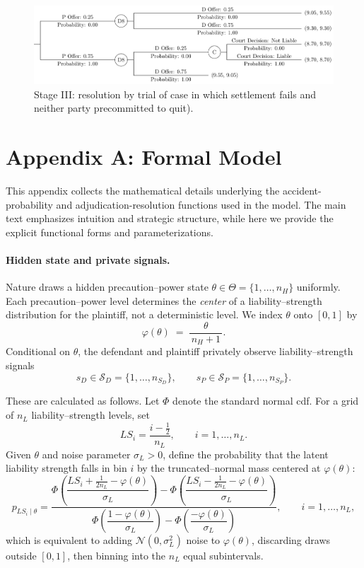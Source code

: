 \documentclass{article}
\begin{document}
  \begin{figure}[t]
    \centering
    \includegraphics[width=\textwidth]{../Figures/smalltree_end_adjudication.pdf}
    \caption{Stage III: resolution by trial of case in which settlement fails and neither party precommitted to quit).}
    \label{fig:smalltree_end_adjudication.pdf}
  \end{figure}

\section*{Appendix A: Formal Model}

This appendix collects the mathematical details underlying the accident-probability and adjudication-resolution functions used in the model. The main text emphasizes intuition and strategic structure, while here we provide the explicit functional forms and parameterizations. 
\paragraph{Hidden state and private signals.}
Nature draws a hidden precaution–power state $\theta\in\Theta=\{1,\dots,n_H\}$ uniformly. Each precaution–power level determines the \emph{center} of a liability–strength distribution for the plaintiff, not a deterministic level. We index $\theta$ onto $[0,1]$ by
\[
\varphi(\theta)\;=\;\frac{\theta}{\,n_H+1\,}.
\]
Conditional on $\theta$, the defendant and plaintiff privately observe liability–strength signals
\[
s_D\in\mathcal{S}_D=\{1,\dots,n_{S_D}\},\qquad
s_P\in\mathcal{S}_P=\{1,\dots,n_{S_P}\}.
\]

These are calculated as follows. Let $\Phi$ denote the standard normal cdf. For a grid of $n_L$ liability–strength levels, set
\[
LS_i=\frac{i-\tfrac12}{n_L},\qquad i=1,\dots,n_L.
\]
Given $\theta$ and noise parameter $\sigma_L>0$, define the probability that the latent liability strength falls in bin $i$ by the truncated–normal mass centered at $\varphi(\theta)$:
\[
p_{LS_i\mid \theta}
=
\frac{
\Phi\!\left(\dfrac{LS_i+\tfrac{1}{2n_L}-\varphi(\theta)}{\sigma_L}\right)
-
\Phi\!\left(\dfrac{LS_i-\tfrac{1}{2n_L}-\varphi(\theta)}{\sigma_L}\right)
}{
\Phi\!\left(\dfrac{1-\varphi(\theta)}{\sigma_L}\right)
-
\Phi\!\left(\dfrac{-\varphi(\theta)}{\sigma_L}\right)
},
\qquad i=1,\dots,n_L,
\]
which is equivalent to adding $\mathcal{N}(0,\sigma_L^2)$ noise to $\varphi(\theta)$, discarding draws outside $[0,1]$, then binning into the $n_L$ equal subintervals.
\end{document}
